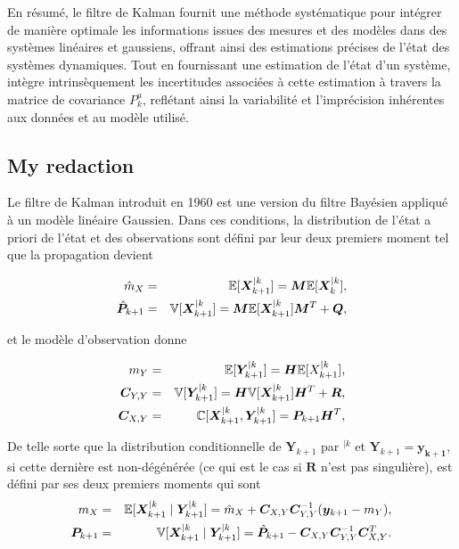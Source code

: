 En résumé, le filtre de Kalman fournit une méthode systématique pour intégrer de manière optimale les informations issues des mesures et des modèles dans des systèmes linéaires et gaussiens, offrant ainsi des estimations précises de l'état des systèmes dynamiques. Tout en fournissant une estimation de l'état d'un système, intègre intrinsèquement les incertitudes associées à cette estimation à travers la matrice de covariance $P_k^a$, reflétant ainsi la variabilité et l'imprécision inhérentes aux données et au modèle utilisé.

\subsection{My redaction}

Le filtre de Kalman introduit en 1960 \cite{kalman_new_1960} est une version du filtre Bayésien appliqué à un modèle linéaire Gaussien. Dans ces conditions, la distribution de l'état a priori de l'état et des observations sont défini par leur deux premiers moment tel que la propagation devient

\begin{eqnarray*}
    \hat m_X &=& \mathbb{E} [\bm X_{k+1}^{\mid k}] = \bm M \mathbb{E} [\bm X_{k}^{\mid k}],\\
    \hat{\bm  P}_{k+1} &=& \mathbb{V} [\bm X_{k+1}^{\mid k}] = \bm M \mathbb{E} [\bm X_{k+1}^{\mid k}] \bm M^T + \bm Q,
\end{eqnarray*}

et le modèle d'observation donne

\begin{eqnarray*}
    m_Y &=& \mathbb{E} [\bm Y_{k+1}^{\mid k}] = \bm H \mathbb{E} [X_{k+1}^{\mid k}],\\
    \bm C_{Y,Y}&=&\mathbb{V} [\bm Y_{k+1}^{\mid k}] = \bm H \mathbb{V} [\bm X_{k+1}^{\mid k}] \bm H^T + \bm R, \\
    \bm C_{X,Y} &=& \mathbb{C}[\bm X_{k+1}^{\mid k},\bm Y^{\mid k}_{k+1}] = \bm P_{k+1} \bm H^T,
\end{eqnarray*}

De telle sorte que la distribution conditionnelle de $\bm Y_{k+1}$ par $^{\mid k}$ et $\bm Y_{k+1} = \bm{y_{k+1}}$, si cette dernière est non-dégénérée (ce qui est le cas si $\bm R$ n'est pas singulière), est défini par ses deux premiers moments qui sont
\begin{eqnarray*}
    m_X &=& \mathbb{E}[\bm X^{\mid k}_{k+1} \mid \bm Y_{k+1}^{\mid k}] = \hat m_X + \bm C_{X,Y} \bm C_{Y,Y}^{-1} (\bm y_{k+1} - m_Y), \\
    \bm P_{k+1} &=& \mathbb{V}[\bm X^{\mid k}_{k+1} \mid \bm Y_{k+1}^{\mid k}] = \hat{\bm  P}_{k+1} - \bm C_{X,Y} \bm C_{Y,Y}^{-1} \bm C_{X,Y}^T.
\end{eqnarray*}

